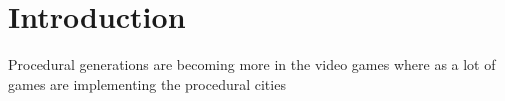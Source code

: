 \chapter{Introduction}
\large Procedural generations are becoming more in the video games where as a lot of games are implementing the procedural cities \cite{parish2001procedural} 
